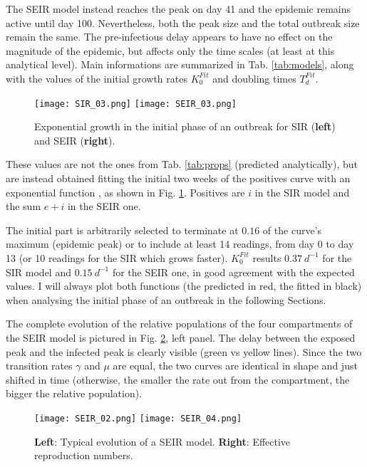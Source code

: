 \documentclass[DIV=12, BCOR=0pt]{scrartcl}  %
\begin{document}
	The SEIR model instead reaches the peak on day 41 and the epidemic remains active until day 100. Nevertheless, both the peak size and the total outbreak size remain the same. The pre-infectious delay appears to have no effect on the magnitude of the epidemic, but affects only the time scales (at least at this analytical level). Main informations are summarized in Tab. \ref{tab:models}, along with the values of the initial growth rates $K_0^{Fit}$ and doubling times $T_d^{Fit}$. 
	\begin{figure}[h!]
		\centering
		\texttt{[image: SIR\_03.png]}
		\texttt{[image: SEIR\_03.png]}
		\caption{Exponential growth in the initial phase of an outbreak for SIR (\textbf{left}) and SEIR (\textbf{right}). }
		\label{fig:BothExp}
	\end{figure}

	These values are not the ones from Tab. \ref{tab:props} (predicted analytically), but are instead obtained fitting the initial two weeks of the positives curve with an exponential function \citep{Bauch2005}, as shown in Fig. \ref{fig:BothExp}. Positives are $i$ in the SIR model and the sum $e + i$ in the SEIR one.
	 
	The initial part is arbitrarily selected to terminate at $0.16$ of the curve's maximum (epidemic peak) or to include at least 14 readings, from day 0 to day 13 (or 10 readings for the SIR which grows faster). 
	$K_0^{Fit}$ results $0.37 \ d^{-1}$ for the SIR model and  $0.15 \ d^{-1}$ for the SEIR one, in good agreement with the expected values. I will always plot both functions (the predicted in red, the fitted in black) when analysing the initial phase of an outbreak in the following Sections. 
	
	
	The complete evolution of the relative populations of the four compartments of the SEIR model is pictured in Fig. \ref{fig:SEIRboth}, left panel. The delay between the exposed peak and the infected peak is clearly visible (green vs yellow lines). Since the two transition rates $\gamma$ and $\mu$ are equal, the two curves are identical in shape and just shifted in time (otherwise, the smaller the rate out from the compartment, the bigger the relative population).
	\begin{figure}[h]
		\centering
		\texttt{[image: SEIR\_02.png]}
		\texttt{[image: SEIR\_04.png]}
		\caption{\textbf{Left}: Typical evolution of a SEIR model. \textbf{Right}: Effective reproduction numbers.} %
		\label{fig:SEIRboth}
	\end{figure}
\end{document}
